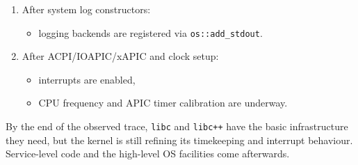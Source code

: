 \documentclass[a4paper,11pt]{article}
\begin{document}
\begin{enumerate}
  \item After system log constructors:
    \begin{itemize}
      \item logging backends are registered via \texttt{os::add\_stdout}.
    \end{itemize}

  \item After ACPI/IOAPIC/xAPIC and clock setup:
    \begin{itemize}
      \item interrupts are enabled,
      \item CPU frequency and APIC timer calibration are underway.
    \end{itemize}
\end{enumerate}

By the end of the observed trace, \texttt{libc} and \texttt{libc++} have
the basic infrastructure they need, but the kernel is still refining its
timekeeping and interrupt behaviour. Service-level code and the
high-level OS facilities come afterwards.
\end{document}
